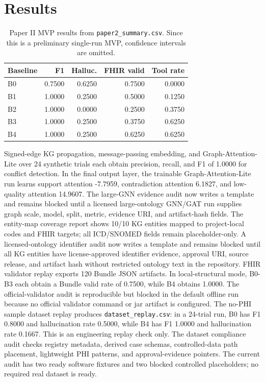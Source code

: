 \documentclass[11pt]{article}
\begin{document}
\section{Results}
\begin{table}[h]
\centering
\caption{Paper II MVP results from \texttt{paper2\_summary.csv}. Since this is a preliminary single-run MVP, confidence intervals are omitted.}
\begin{tabular}{lrrrr}
\toprule
Baseline & F1 & Halluc. & FHIR valid & Tool rate \\
\midrule
B0 & 0.7500 & 0.6250 & 0.7500 & 0.0000 \\
B1 & 1.0000 & 0.2500 & 0.5000 & 0.1250 \\
B2 & 1.0000 & 0.0000 & 0.2500 & 0.3750 \\
B3 & 1.0000 & 0.2500 & 0.3750 & 0.6250 \\
B4 & 1.0000 & 0.2500 & 0.6250 & 0.6250 \\
\bottomrule
\end{tabular}
\end{table}
Signed-edge KG propagation, message-passing embedding, and Graph-Attention-Lite over 24 synthetic trials each obtain precision, recall, and F1 of 1.0000 for conflict detection. In the final output layer, the trainable Graph-Attention-Lite run learns support attention -7.7959, contradiction attention 6.1827, and low-quality attention 14.9607.
The large-GNN evidence audit now writes a template and remains blocked until a licensed large-ontology GNN/GAT run supplies graph scale, model, split, metric, evidence URI, and artifact-hash fields.
The entity-map coverage report shows 10/10 KG entities mapped to project-local codes and FHIR targets; all ICD/SNOMED fields remain placeholder-only. A licensed-ontology identifier audit now writes a template and remains blocked until all KG entities have license-approved identifier evidence, approval URI, source release, and artifact hash without restricted ontology text in the repository.
FHIR validator replay exports 120 Bundle JSON artifacts. In local-structural mode, B0-B3 each obtain a Bundle valid rate of 0.7500, while B4 obtains 1.0000.
The official-validator audit is reproducible but blocked in the default offline run because no official validator command or jar artifact is configured.
The no-PHI sample dataset replay produces \texttt{dataset\_replay.csv}: in a 24-trial run, B0 has F1 0.8000 and hallucination rate 0.5000, while B4 has F1 1.0000 and hallucination rate 0.1667. This is an engineering replay check only.
The dataset compliance audit checks registry metadata, derived case schemas, controlled-data path placement, lightweight PHI patterns, and approval-evidence pointers. The current audit has two ready software fixtures and two blocked controlled placeholders; no required real dataset is ready.
\end{document}
